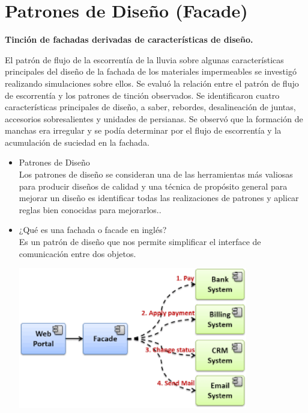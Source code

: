 \section{Patrones de Diseño (Facade)} 
\textbf{Tinción de fachadas derivadas de características de diseño.}\\
\begin{flushleft}
El patrón de flujo de la escorrentía de la lluvia sobre algunas características principales del diseño de la fachada de los materiales impermeables se investigó realizando simulaciones sobre ellos. Se evaluó la relación entre el patrón de flujo de escorrentía y los patrones de tinción observados. Se identificaron cuatro características principales de diseño, a saber, rebordes, desalineación de juntas, accesorios sobresalientes y unidades de persianas. Se observó que la formación de manchas era irregular y se podía determinar por el flujo de escorrentía y la acumulación de suciedad en la fachada.

\begin{itemize}
	\item Patrones de Diseño
	\\Los patrones de diseño se consideran una de las herramientas más valiosas para producir diseños de calidad y una técnica de propósito general para mejorar un diseño es identificar todas las realizaciones de patrones y aplicar reglas bien conocidas para mejorarlos..


	


	\item ¿Qué es una fachada o facade en inglés?
	\\ Es un patrón de diseño que nos permite simplificar el interface de comunicación entre dos objetos.
	\begin{center}
	\includegraphics[width=10cm]{./images/1} 
	\end{center}


\end{itemize}
\end{flushleft}
